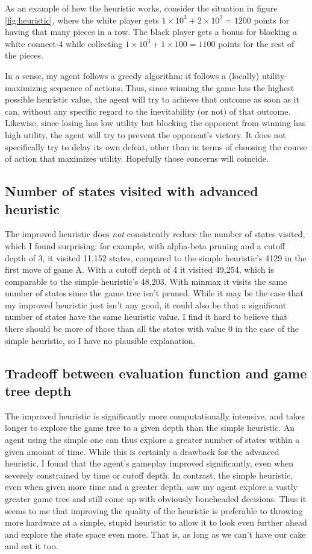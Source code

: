 \documentclass[letterpaper, 10pt]{article}
\numberwithin{theorem}{section}
\begin{document}
As an example of how the heuristic works, consider the situation in figure \ref{fig:heuristic}, where the white player gets $1 \times 10^3 + 2 \times 10^2 = 1200$ points for having that many pieces in a row. The black player gets a bonus for blocking a white connect-4 while collecting $1 \times 10^3 + 1 \times 100 = 1100$ points for the rest of the pieces.

In a sense, my agent follows a greedy algorithm: it follows a (locally) utility-maximizing sequence of actions. Thus, since winning the game has the highest possible heuristic value, the agent will try to achieve that outcome as soon as it can, without any specific regard to the inevitability (or not) of that outcome. Likewise, since losing has low utility but blocking the opponent from winning has high utility, the agent will try to prevent the opponent's victory. It does not specifically try to delay its own defeat, other than in terms of choosing the course of action that maximizes utility. Hopefully those concerns will coincide.

\subsection{Number of states visited with advanced heuristic}
The improved heuristic does \emph{not} consistently reduce the number of states visited, which I found surprising: for example, with alpha-beta pruning and a cutoff depth of 3, it visited 11,152 states, compared to the simple heuristic's 4129 in the first move of game A. With a cutoff depth of 4 it visited 49,254, which is comparable to the simple heuristic's 48,203. With minmax it visits the same number of states since the game tree isn't pruned. While it may be the case that my improved heuristic just isn't any good, it could also be that a significant number of states have the same heuristic value. I find it hard to believe that there should be more of those than all the states with value 0 in the case of the simple heuristic, so I have no plausible explanation.

\subsection{Tradeoff between evaluation function and game tree depth}
The improved heuristic is significantly more computationally intensive, and takes longer to explore the game tree to a given depth than the simple heuristic. An agent using the simple one can thus explore a greater number of states within a given amount of time. While this is certainly a drawback for the advanced heuristic, I found that the agent's gameplay improved significantly, even when severely constrained by time or cutoff depth. In contrast, the simple heuristic, even when given more time and a greater depth, saw my agent explore a vastly greater game tree and still come up with obviously boneheaded decisions. Thus it seems to me that improving the quality of the heuristic is preferable to throwing more hardware at a simple, stupid heuristic to allow it to look even further ahead and explore the state space even more. That is, as long as we can't have our cake and eat it too.
\end{document}

